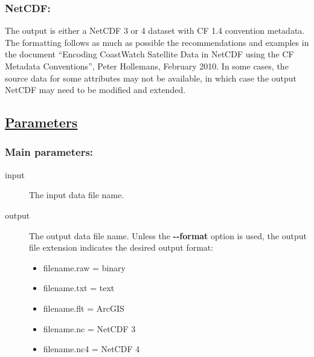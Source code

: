 \subsubsection*{NetCDF:}


 The output is either a NetCDF 3 or 4 dataset with CF 1.4 convention metadata. The formatting follows as much as possible the recommendations and examples in the document ``Encoding CoastWatch Satellite Data in NetCDF using the CF Metadata Conventions'', Peter Hollemans, February 2010. In some cases, the source data for some attributes may not be available, in which case the output NetCDF may need to be modified and extended.
\subsection*{\underline{Parameters}}
\subsubsection*{Main parameters:}
\begin{description}
\item[ input ] The input data file name. 
\item[ output ] The output data file name. Unless the \textbf{-{-}format}
 option is used, the output file extension indicates the desired output format: \begin{itemize}
\item filename.raw = binary
\item filename.txt = text
\item filename.flt = ArcGIS
\item filename.nc = NetCDF 3
\item filename.nc4 = NetCDF 4

\end{itemize}


\end{description}
